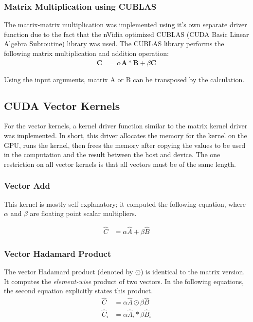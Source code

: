 \documentclass[11pt]{article}
\begin{document}
\subsubsection{Matrix Multiplication using CUBLAS}
The matrix-matrix multiplication was implemented using it's own separate driver function due to the fact that the nVidia optimized CUBLAS (CUDA Basic Linear Algebra Subroutine) library was used. The CUBLAS library performs the following matrix multiplication and addition operation:
\begin{align*}
	\mathbf{C} & = \alpha \mathbf{A} * \mathbf{B} + \beta \mathbf{C} 
\end{align*}

Using the input arguments, matrix A or B can be transposed by the calculation.

\subsection{CUDA Vector Kernels}
For the vector kernels, a kernel driver function similar to the matrix kernel driver was implemented. In short, this driver allocates the memory for the kernel on the GPU, runs the kernel, then frees the memory after copying the values to be used in the computation and the result between the host and device. The one restriction on all vector kernels is that all vectors must be of the same length.

\subsubsection{Vector Add}
This kernel is mostly self explanatory; it computed the following equation, where $\alpha$ and $\beta$ are floating point scalar multipliers.

\begin{align*}
	\hat{C} & = \alpha \hat{A} + \beta \hat{B} 
\end{align*}

\subsubsection{Vector Hadamard Product}
The vector Hadamard product (denoted by $\odot$) is identical to the matrix version. It computes the \textit{element-wise} product of two vectors. In the following equations, the second equation explicitly states this product.
\begin{align*}
	\hat{C}     & = \alpha \hat{A} \odot \beta \hat{B}     \\
	\hat{C}_{i} & = \alpha \hat{A}_{i} * \beta \hat{B}_{i} 
\end{align*}
\end{document}
